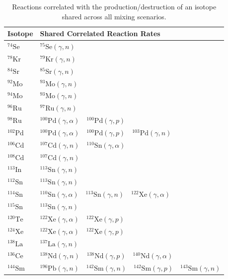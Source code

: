\begin{table}
\caption{Reactions correlated with the production/destruction of an isotope shared across all mixing scenarios.
\label{tab:shared_rates}}
\begin{tabular}{l|l}
    \toprule
    \textbf{Isotope} & \textbf{Shared Correlated Reaction Rates} \\ 
    \toprule
    $^{74}\mathrm{Se}$ & $^{75}\mathrm{Se}(\gamma,n)$ \\
    $^{78}\mathrm{Kr}$ & $^{79}\mathrm{Kr}(\gamma,n)$ \\
    $^{84}\mathrm{Sr}$ & $^{85}\mathrm{Sr}(\gamma,n)$ \\
    $^{92}\mathrm{Mo}$ & $^{93}\mathrm{Mo}(\gamma,n)$ \\
    $^{94}\mathrm{Mo}$ & $^{93}\mathrm{Mo}(\gamma,n)$ \\
    $^{96}\mathrm{Ru}$ & $^{97}\mathrm{Ru}(\gamma,n)$ \\
    $^{98}\mathrm{Ru}$ & $^{100}\mathrm{Pd}(\gamma,\alpha)$~~$^{100}\mathrm{Pd}(\gamma,p)$ \\
    $^{102}\mathrm{Pd}$ & $^{100}\mathrm{Pd}(\gamma,\alpha)$~~$^{100}\mathrm{Pd}(\gamma,p)$~~$^{103}\mathrm{Pd}(\gamma,n)$ \\
    $^{106}\mathrm{Cd}$ & $^{107}\mathrm{Cd}(\gamma,n)$~~$^{110}\mathrm{Sn}(\gamma,\alpha)$ \\
    $^{108}\mathrm{Cd}$ & $^{107}\mathrm{Cd}(\gamma,n)$ \\
    $^{113}\mathrm{In}$ & $^{113}\mathrm{Sn}(\gamma,n)$ \\
    $^{112}\mathrm{Sn}$ & $^{113}\mathrm{Sn}(\gamma,n)$ \\
    $^{114}\mathrm{Sn}$ & $^{110}\mathrm{Sn}(\gamma,\alpha)$~~$^{113}\mathrm{Sn}(\gamma,n)$~~$^{122}\mathrm{Xe}(\gamma,\alpha)$ \\
    $^{115}\mathrm{Sn}$ & $^{113}\mathrm{Sn}(\gamma,n)$ \\
    $^{120}\mathrm{Te}$ & $^{122}\mathrm{Xe}(\gamma,\alpha)$~~$^{122}\mathrm{Xe}(\gamma,p)$ \\
    $^{124}\mathrm{Xe}$ & $^{122}\mathrm{Xe}(\gamma,\alpha)$~~$^{122}\mathrm{Xe}(\gamma,p)$ \\
    $^{138}\mathrm{La}$ & $^{137}\mathrm{La}(\gamma,n)$ \\
    $^{136}\mathrm{Ce}$ & $^{138}\mathrm{Nd}(\gamma,n)$~~$^{138}\mathrm{Nd}(\gamma,p)$~~$^{140}\mathrm{Nd}(\gamma,\alpha)$ \\
    $^{144}\mathrm{Sm}$ & $^{196}\mathrm{Pb}(\gamma,n)$~~$^{142}\mathrm{Sm}(\gamma,n)$~~$^{142}\mathrm{Sm}(\gamma,p)$~~$^{143}\mathrm{Sm}(\gamma,n)$ \\

\end{tabular}
\end{table}
